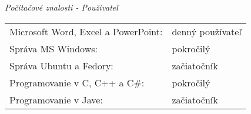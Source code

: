 \documentclass{article}
\begin{document}
\begin{flushleft}
\bigskip

\Large
\textit{\textsf{Počítačové znalosti - Používateľ\\}}
\normalsize

\smallskip

\begin{adjustwidth}{-6pt}{}
	\begin{tabular}{l l}
		Microsoft Word, Excel a PowerPoint: & denný používateľ \\
		Správa MS Windows: & pokročilý \\
		Správa Ubuntu a Fedory: & začiatočník \\
		Programovanie v C, C++ a C\#: & pokročilý \\
		Programovanie v Jave: & začiatočník
	\end{tabular}
\end{adjustwidth}

\end{flushleft}
\end{document}
